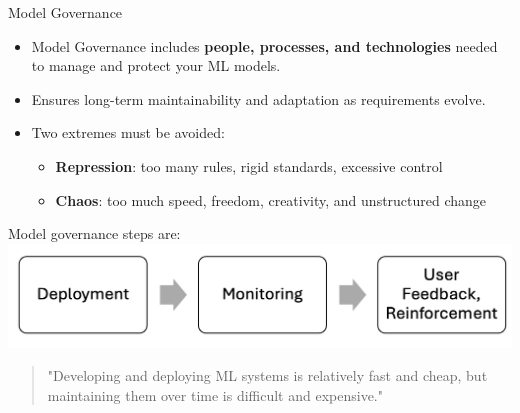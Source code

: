 \documentclass[10pt,compress,t,notes=noshow, xcolor=table]{beamer}
\begin{document}
\begin{frame}{Model Governance}
\label{model-governance-3}


\begin{itemize}
  \item Model Governance includes \textbf{people, processes, and technologies} needed to manage and protect your ML models.
    \item Ensures long-term maintainability and adaptation as requirements evolve.
  \item Two extremes must be avoided:
    \begin{itemize}
      \item \textbf{Repression}: too many rules, rigid standards, excessive control
      \item \textbf{Chaos}: too much speed, freedom, creativity, and unstructured change
    \end{itemize}
\end{itemize}

    Model governance steps are:
    \includegraphics[width = \linewidth]{figure_man/Model Governace.png}

    
\begin{quote}
\footnotesize
"Developing and deploying ML systems is relatively fast and cheap, but
maintaining them over time is difficult and expensive."
\hfill~
\end{quote}
\end{frame}

\end{document}
